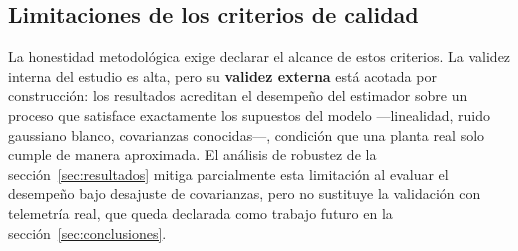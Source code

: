 \subsection{Limitaciones de los criterios de calidad}

La honestidad metodológica exige declarar el alcance de estos criterios. La
validez interna del estudio es alta, pero su \textbf{validez externa} está
acotada por construcción: los resultados acreditan el desempeño del estimador
sobre un proceso que satisface exactamente los supuestos del modelo —linealidad,
ruido gaussiano blanco, covarianzas conocidas—, condición que una planta real
solo cumple de manera aproximada. El análisis de robustez de la
sección~\ref{sec:resultados} mitiga parcialmente esta limitación al evaluar el
desempeño bajo desajuste de covarianzas, pero no sustituye la validación con
telemetría real, que queda declarada como trabajo futuro en la
sección~\ref{sec:conclusiones}.
